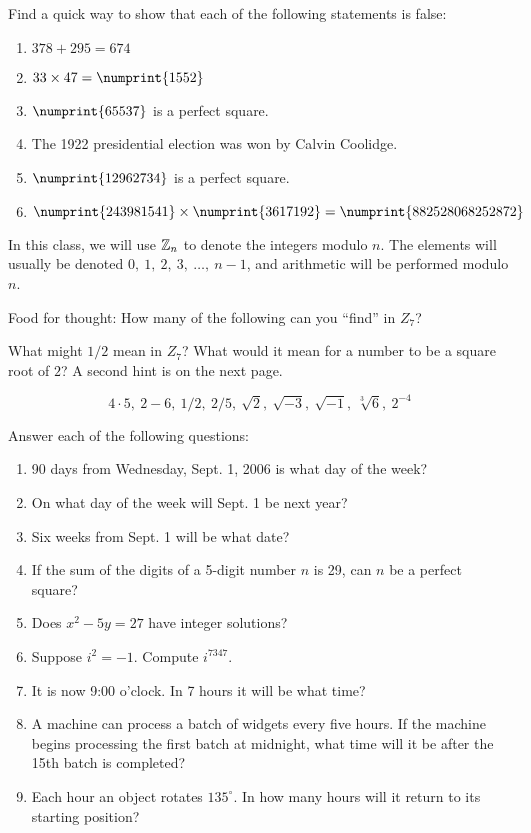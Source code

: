 \documentclass[space,nooutcomes]{ximera}
\begin{document}
\begin{problem}
Find a quick way to show that each of the following statements is false: 
\begin{enumerate}
\item $378 + 295 = 674$
\item $33 \times 47 = \numprint{1552}$
\item $\numprint{65537}$ is a perfect square.
\item The 1922 presidential election was won by Calvin Coolidge.
\item $\numprint{12962734}$ is a perfect square.
\item $\numprint{243981541} \times \numprint{3617192} = \numprint{882528068252872}$
\end{enumerate}
\end{problem}

In this class, we will use $\mathbb Z_n$ to denote the integers modulo $n$.  The elements will usually be denoted $0,\ 1,\ 2,\ 3,\ \dots,\ n - 1$, and arithmetic will be performed modulo $n$.  

\begin{problem}
Food for thought:  How many of the following can you ``find'' in $Z_7$?  
\begin{hint}
What might $1/2$ mean in $Z_7$?  What would it mean for a number to be a square root of $2$?  A second hint is on the next page.
\end{hint}
\[
4\cdot 5,\ 2 - 6,\ 1/2,\ 2/5,\ \sqrt{2},\ \sqrt{-3},\ \sqrt{-1},\ \sqrt[3]{6},\ 2^{-4}
\]
\end{problem}

\begin{problem}
Answer each of the following questions: 
\begin{enumerate}
\item 90 days from Wednesday, Sept. 1, 2006 is what day of the week?
\item On what day of the week will Sept. 1 be next year?
\item Six weeks from Sept. 1 will be what date?
\item If the sum of the digits of a 5-digit number $n$ is 29, can $n$ be a perfect square?
\item Does $x^2 - 5y = 27$ have integer solutions?
\item Suppose $i^2 = -1$.  Compute $i^{7347}$.
\item It is now 9:00 o'clock.  In 7 hours it will be what time?
\item A machine can process a batch of widgets every five hours.  If the machine begins processing the first batch at midnight, what time will it be after the 15th batch is completed?
\item Each hour an object rotates $135^\circ$.  In how many hours will it return to its starting position?  
\end{enumerate}
\end{problem}
\end{document}
